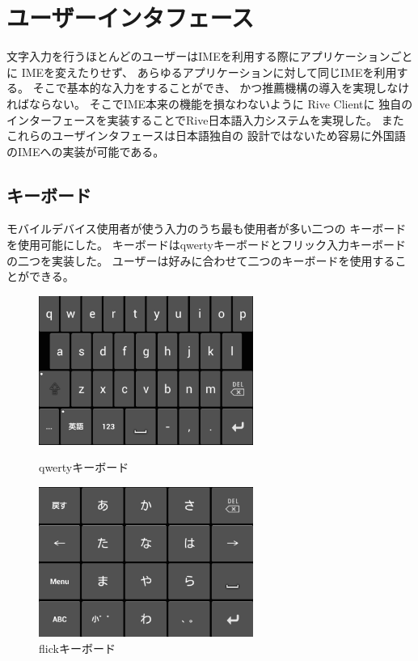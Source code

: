 \chapter{ユーザーインタフェース}
\label{chap:userinterface}
文字入力を行うほとんどのユーザーはIMEを利用する際にアプリケーションごとに
IMEを変えたりせず、
あらゆるアプリケーションに対して同じIMEを利用する。
そこで基本的な入力をすることができ、
かつ推薦機構の導入を実現しなければならない。
そこでIME本来の機能を損なわないように
Rive Clientに
独自のインターフェースを実装することでRive日本語入力システムを実現した。
またこれらのユーザインタフェースは日本語独自の
設計ではないため容易に外国語のIMEへの実装が可能である。

\newpage
\section{キーボード}
モバイルデバイス使用者が使う入力のうち最も使用者が多い二つの
キーボードを使用可能にした。
キーボードはqwertyキーボードとフリック入力キーボードの二つを実装した。
ユーザーは好みに合わせて二つのキーボードを使用することができる。
\begin{figure}[htbp]
  \begin{minipage}{0.5\hsize}
    \begin{center}
      \includegraphics[width=7cm,bb=0 0 417 290]{images/qwerty.png}
    \end{center}
    \caption{qwertyキーボード}
    \label{fig:qwerty}
  \end{minipage}
  \begin{minipage}{0.5\hsize}
    \begin{center}
      \includegraphics[width=7cm,bb=0 0 415 290]{images/flick.png}
    \end{center}
    \caption{flickキーボード}
    \label{fig:flick}
  \end{minipage}
\end{figure}

